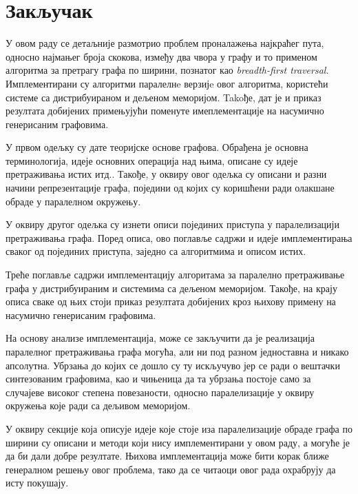 \chapter{Закључак}
У овом раду се детаљније размотрио проблем проналажења најкраћег пута, односно најмањег броја скокова, између два чвора у графу и то применом алгоритма за претрагу графа по ширини, познатог као \textit{breadth-first traversal}. Имплементирани су алгоритми паралелнe верзијe овог алгоритма, користећи системе са дистрибуираном и дељеном меморијом. Takoђе, дат је и приказ резултата добијених примењујући поменуте имеплементације на насумично генерисаним графовима.

\par
У првом одељку су дате теоријске основе графова. Обрађена је основна терминологија, идеје основних операција над њима, описане су идеје претраживања истих итд.. Такође, у оквиру овог одељка су описани и разни начини репрезентације графа, поједини од којих су коришћени ради олакшане обраде у паралелном окружењу.

\par
У оквиру другог одељка су изнети описи појединих приступа у паралелизацији претраживања графа. Поред описа, ово поглавље садржи и идеје имплементирања сваког од појединих приступа, заједно са алгоритмима и описом истих. 

\par
Треће поглавље садржи имплементацију алгоритама за паралелно претраживање графа у дистрибуираним и системима са дељеном меморијом. Такође, на крају описа сваке од њих стоји приказ резултата добијених кроз њихову примену на насумично генерисаним графовима.

\par
На основу анализе имплементација, може се закључити да је реализација паралелног претраживања графа могућа, али ни под разном једноставна и никако апсолутна. Убрзања до којих се дошло су ту искључуво јер се ради о вештачки синтезованим графовима, као и чињеница да та убрзања постоје само за случајеве високог степена повезаности, односно паралелизације у оквиру окружења које ради са дељивом меморијом.

\par
У оквиру секције која описује идеје које стоје иза паралелизације обраде графа по ширини су описани и методи који нису имплементирани у овом раду, а могуће је да би дали добре резултате. Њихова имплементација може бити корак ближе генералном решењу овог проблема, тако да се читаоци овог рада охрабрују да исту покушају.